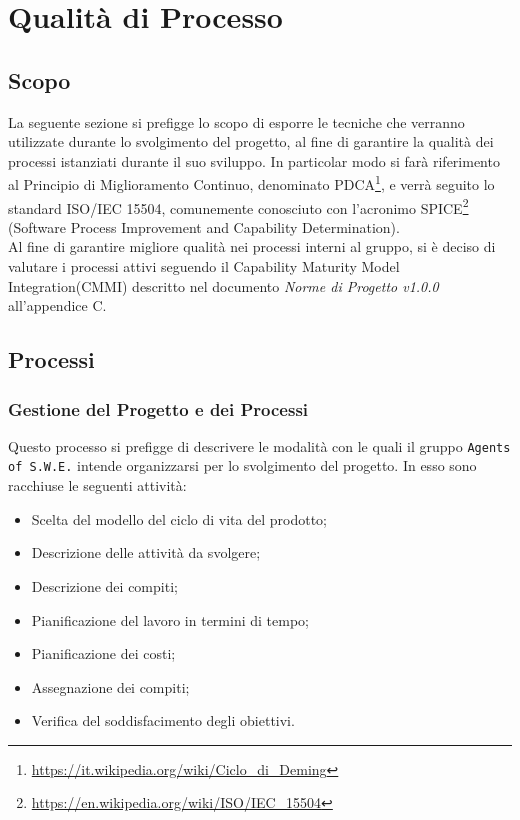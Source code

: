 \section{Qualità di Processo}
\label{qualitaProcesso}

\subsection{Scopo}

La seguente sezione si prefigge lo scopo di esporre le tecniche che verranno utilizzate durante lo svolgimento del progetto, al fine di garantire la qualità dei processi istanziati durante il suo sviluppo. In particolar modo si farà riferimento al Principio di Miglioramento Continuo, denominato PDCA\glossario\footnote{\url{https://it.wikipedia.org/wiki/Ciclo_di_Deming}}, e verrà seguito lo standard ISO/IEC 15504, comunemente conosciuto con l'acronimo SPICE\glossario\footnote{\url{https://en.wikipedia.org/wiki/ISO/IEC_15504}} (Software Process Improvement and Capability Determination).\\
Al fine di garantire migliore qualità nei processi interni al gruppo, si è deciso di valutare i processi attivi seguendo il Capability Maturity Model Integration(CMMI) descritto nel documento \textit{Norme di Progetto v1.0.0} all'appendice C.

\subsection{Processi}
\subsubsection{Gestione del Progetto e dei Processi} 

Questo processo si prefigge di descrivere le modalità con le quali il gruppo \texttt{Agents of S.W.E.} intende organizzarsi per lo svolgimento del progetto. In esso sono racchiuse le seguenti attività:
\begin{itemize}
	\item Scelta del modello del ciclo di vita del prodotto;
	\item Descrizione delle attività da svolgere;
	\item Descrizione dei compiti;
	\item Pianificazione del lavoro in termini di tempo;
	\item Pianificazione dei costi;
	\item Assegnazione dei compiti;
	\item Verifica del soddisfacimento degli obiettivi.
\end{itemize}

